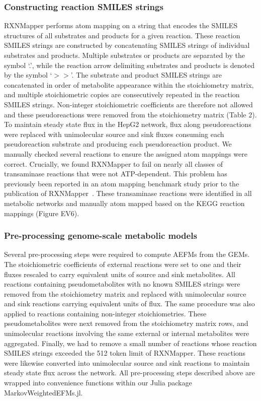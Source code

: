 \documentclass[12pt]{article}
\begin{document}
\subsubsection*{Constructing reaction SMILES strings}

RXNMapper performs atom mapping on a string that encodes the SMILES
structures of all substrates and products for a given reaction. These
reaction SMILES strings are constructed by concatenating SMILES strings of
individual substrates and products. Multiple substrates or products are
separated by the symbol `.', while the reaction arrow delimiting
substrates and products is denoted by the symbol `$>>$'. The substrate and
product SMILES strings are concatenated in order of metabolite appearance
within the stoichiometry matrix, and multiple stoichiometric copies are
consecutively repeated in the reaction SMILES strings. Non-integer
stoichiometric coefficients are therefore not allowed and these
pseudoreactions were removed from the stoichiometry matrix (Table 2). To
maintain steady state flux in the HepG2 network, flux along
pseudoreactions were replaced with unimolecular source and sink fluxes
consuming each pseudoreaction substrate and producing each pseudoreaction
product. We manually checked several reactions to ensure the assigned
atom mappings were correct. Crucially, we found RXNMapper to fail on
nearly all classes of transaminase reactions that were not ATP-dependent.
This problem has previously been reported in an atom mapping benchmark
study prior to the publication of
RXNMapper~\citep{PreciatGonzalezGermanA.2017Ceoa}. These transaminase
reactions were identified in all metabolic networks and manually atom
mapped based on the KEGG reaction mappings (Figure EV6).

\subsubsection*{Pre-processing genome-scale metabolic models}

Several pre-processing steps were required to compute AEFMs from the GEMs.
The stoichiometric coefficients of external reactions were set to one and
their fluxes rescaled to carry equivalent units of source and sink
metabolites. All reactions containing pseudometabolites with no known
SMILES strings were removed from the stoichiometry matrix and replaced
with unimolecular source and sink reactions carrying equivalent units of
flux. The same procedure was also applied to reactions containing
non-integer stoichiometries. These pseudometabolites were next removed
from the stoichiometry matrix rows, and unimolecular reactions involving
the same external or internal metabolites were aggregated. Finally, we had
to remove a small number of reactions whose reaction SMILES strings
exceeded the 512 token limit of RXNMapper. These reactions were likewise
converted into unimolecular source and sink reactions to maintain steady
state flux across the network. All pre-processing steps described above
are wrapped into convenience functions within our Julia package
MarkovWeightedEFMs.jl.
\end{document}
